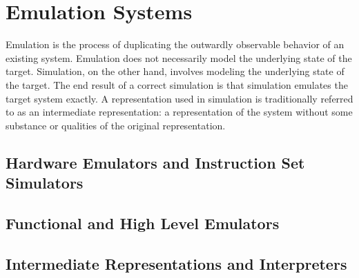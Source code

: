 \chapter{Emulation Systems}

Emulation is the process of duplicating the outwardly observable behavior of an existing system.
Emulation does not necessarily model the underlying state of the target.
Simulation, on the other hand, involves modeling the underlying state of the target.
The end result of a correct simulation is that simulation emulates the target system exactly.
A representation used in simulation is traditionally referred to as an intermediate representation: a representation of the system without some substance or qualities of the original representation.

\section{Hardware Emulators and Instruction Set Simulators}

\section{Functional and High Level Emulators}

\section{Intermediate Representations and Interpreters}


